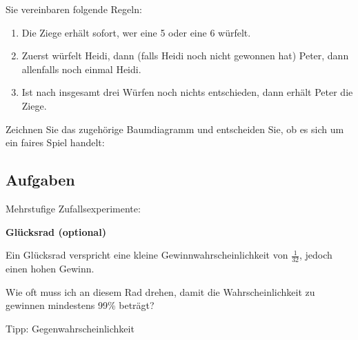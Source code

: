 Sie vereinbaren folgende Regeln:

\begin{enumerate}
\item Die Ziege erhält sofort, wer eine 5 oder eine 6 würfelt.
\item Zuerst würfelt Heidi, dann (falls Heidi noch nicht gewonnen hat) Peter, dann allenfalls noch einmal Heidi.
\item Ist nach insgesamt drei Würfen noch nichts entschieden, dann erhält Peter die Ziege.
\end{enumerate}


Zeichnen Sie das zugehörige Baumdiagramm und entscheiden Sie, ob es sich um ein faires Spiel handelt:

\newpage

\subsection*{Aufgaben}

Mehrstufige Zufallsexperimente:

\newpage

\textbf{Glücksrad (optional)}


Ein Glücksrad verspricht eine kleine
Gewinnwahrscheinlichkeit von $\frac1{32}$, jedoch einen hohen Gewinn.

Wie oft muss ich an diesem Rad drehen, damit die Wahrscheinlichkeit zu
gewinnen mindestens 99\% beträgt?

Tipp: Gegenwahrscheinlichkeit


